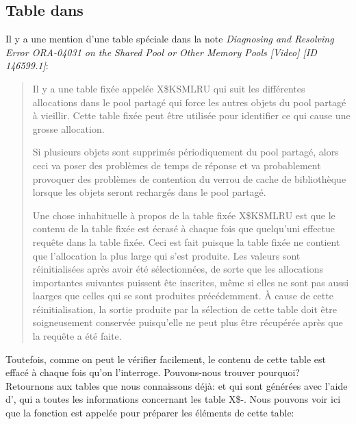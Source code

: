 ﻿\subsection{Table  dans \oracle}
\myindex{\oracle}

Il y a une mention d'une table spéciale dans la note \emph{Diagnosing and Resolving
Error ORA-04031 on the Shared Pool or Other Memory Pools [Video] [ID 146599.1]}:

\begin{framed}
\begin{quotation}
Il y a une table fixée appelée X\$KSMLRU qui suit les différentes allocations dans
le pool partagé qui force les autres objets du pool partagé à vieillir. Cette table
fixée peut être utilisée pour identifier ce qui cause une grosse allocation.

Si plusieurs objets sont supprimés périodiquement du pool partagé, alors ceci va poser des problèmes de temps de réponse
et va probablement provoquer des problèmes de contention du verrou de cache de bibliothèque lorsque
les objets seront rechargés dans le pool partagé.

Une chose inhabituelle à propos de la table fixée X\$KSMLRU est que le contenu de la table fixée est écrasé à chaque fois que
quelqu'uni effectue requête dans la table fixée. Ceci est fait puisque la table fixée ne contient que l'allocation la plus large
qui s'est produite. Les valeurs sont réinitialisées après avoir été sélectionnées, de sorte que les allocations importantes
suivantes puissent ête inscrites, même si elles ne sont pas aussi laarges que celles qui se sont produites précédemment.
À cause de cette réinitialisation, la sortie produite par la sélection de cette table doit être soigneusement conservée
puisqu'elle ne peut plus être récupérée après que la requête a été faite.
\end{quotation}
\end{framed}

Toutefois, comme on peut le vérifier facilement, le contenu de cette table est effacé à chaque fois qu'on l'interroge.
Pouvons-nous trouver pourquoi?
Retournons aux tables que nous connaissons déjà:  et  qui
sont générées avec l'aide d'\oracletables, qui a toutes les informations concernant les table X\$-.
Nous pouvons voir ici que la fonction  est appelée pour préparer les éléments de cette table:


